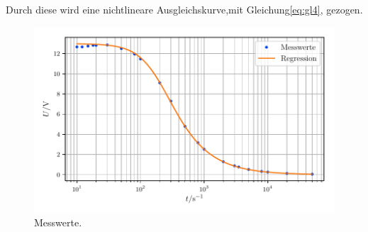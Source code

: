 Durch diese wird eine nichtlineare Ausgleichskurve,mit Gleichung\eqref{eq:gl4}, gezogen.
\begin{figure}[H]
    \centering
    \includegraphics[width=\textwidth]{build/messung2.pdf}
    \caption{Messwerte.}
    \label{fig:plot2}
\end{figure}
%

